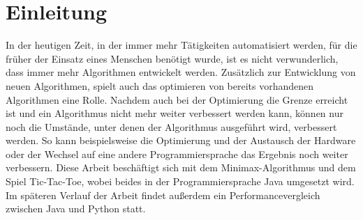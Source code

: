 \chapter{Einleitung}
In der heutigen Zeit, in der immer mehr Tätigkeiten automatisiert werden, für die früher der Einsatz eines Menschen benötigt wurde,
ist es nicht verwunderlich, dass immer mehr Algorithmen entwickelt werden. Zusätzlich zur Entwicklung von neuen Algorithmen, spielt
auch das optimieren von bereits vorhandenen Algorithmen eine Rolle. Nachdem auch bei der Optimierung die Grenze erreicht ist und ein
Algorithmus nicht mehr weiter verbessert werden kann, können nur noch die Umstände, unter denen der Algorithmus ausgeführt wird,
verbessert werden. So kann beispielsweise die Optimierung und der Austausch der Hardware oder der Wechsel auf eine andere
Programmiersprache das Ergebnis noch weiter verbessern. Diese Arbeit beschäftigt sich mit dem Minimax-Algorithmus und dem Spiel
Tic-Tac-Toe, wobei beides in der Programmiersprache Java umgesetzt wird. Im späteren Verlauf der Arbeit findet außerdem ein
Performancevergleich zwischen Java und Python statt.